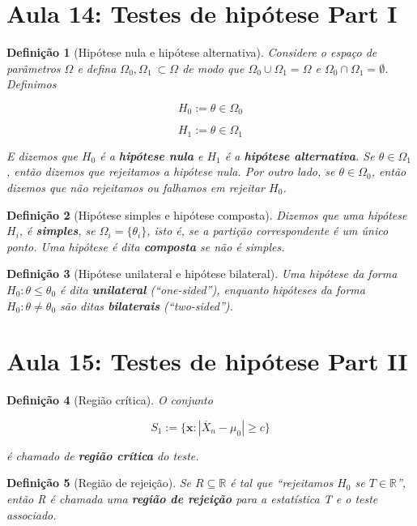\documentclass{article}
\newtheorem{definition}{Definição}
\begin{document}
\section*{Aula 14: Testes de hipótese Part I}
\label{s14}
\begin{definition}[Hipótese nula e hipótese alternativa]
Considere o espaço de parâmetros $\Omega$ e defina $\Omega_0, \Omega_1 \ \subset \Omega$ de modo que $\Omega_0 \cup \Omega_1 = \Omega$ e $\Omega_0 \cap \Omega_1 = \emptyset$. Definimos

$$H_0 := \theta \in \Omega_0$$

$$H_1 := \theta \in \Omega_1$$

E dizemos que $H_0$ é a \textbf{hipótese nula} e $H_1$ é a \textbf{hipótese alternativa}.
Se $\theta \in \Omega_1$, então dizemos que rejeitamos a hipótese nula. Por outro lado, se $\theta \in \Omega_0$, então dizemos que não rejeitamos ou falhamos em rejeitar $H_0$.
\end{definition}

\begin{definition}[Hipótese simples e hipótese composta]
Dizemos que uma hipótese $H_i$, é \textbf{simples}, se $\Omega_i = \{ \theta_i \}$, isto é, se a partição correspondente é um único ponto. Uma hipótese é dita \textbf{composta} se não é simples.
\end{definition}

\begin{definition}[Hipótese unilateral e hipótese bilateral]
Uma hipótese da forma $H_0 : \theta \leq \theta_0$ é dita \textbf{unilateral} (``one-sided''), enquanto hipóteses da forma $H_0 : \theta \neq \theta_0$ são ditas \textbf{bilaterais} (``two-sided'').
\end{definition}

\section*{Aula 15: Testes de hipótese Part II}
\label{s15}
\begin{definition}[Região crítica]
O conjunto

$$S_1 := \{ \textbf{x} : | \overline{X}_n - \mu_0 | \geq c \}$$

é chamado de \textbf{região crítica} do teste.
\end{definition}

\begin{definition}[Região de rejeição]
Se $R \subseteq \mathbb{R}$ é tal que ``rejeitamos $H_0$ se $T \in \mathbb{R}$'', então R é chamada uma \textbf{região de rejeição} para a estatística T e o teste associado.
\end{definition}
\end{document}
